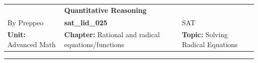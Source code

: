 \documentclass[11pt,paper=a4,answers]{exam}
\begin{document}
\begin{center}
    \centering
    \renewcommand{\arraystretch}{1.5}
    \begin{tabularx}{\textwidth}{YYY}
    & \normalsize\bf{{\Large{{Quantitative Reasoning}}}} & \\
    By Preppeo & \normalsize\bf{{sat\_lid\_025}} & SAT\\
    \normalsize{{\textbf{{Unit:}} Advanced Math}} & \normalsize{{\textbf{{Chapter:}} Rational and radical equations/functions}} & \normalsize{{\textbf{{Topic:}} Solving Radical Equations}} \\
    \end{tabularx}
\end{center}
\par\noindent\rule{\textwidth}{1pt}
\end{document}
